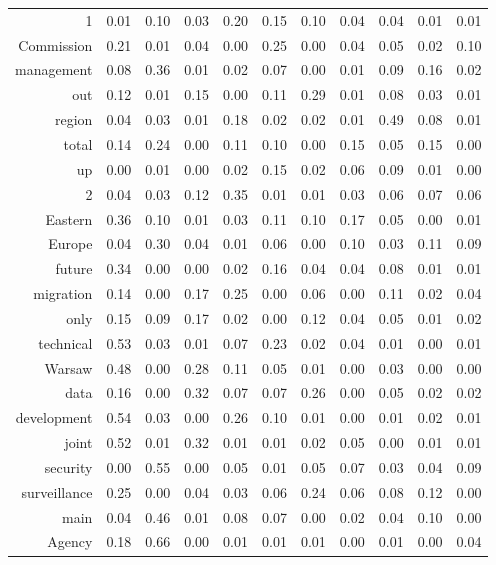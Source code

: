 \begin{longtable}{rrrrrrrrrrr}
  1 & 0.01 & 0.10 & 0.03 & 0.20 & 0.15 & 0.10 & 0.04 & 0.04 & 0.01 & 0.01 \\ 
  Commission & 0.21 & 0.01 & 0.04 & 0.00 & 0.25 & 0.00 & 0.04 & 0.05 & 0.02 & 0.10 \\ 
  management & 0.08 & 0.36 & 0.01 & 0.02 & 0.07 & 0.00 & 0.01 & 0.09 & 0.16 & 0.02 \\ 
  out & 0.12 & 0.01 & 0.15 & 0.00 & 0.11 & 0.29 & 0.01 & 0.08 & 0.03 & 0.01 \\ 
  region & 0.04 & 0.03 & 0.01 & 0.18 & 0.02 & 0.02 & 0.01 & 0.49 & 0.08 & 0.01 \\ 
  total & 0.14 & 0.24 & 0.00 & 0.11 & 0.10 & 0.00 & 0.15 & 0.05 & 0.15 & 0.00 \\ 
  up & 0.00 & 0.01 & 0.00 & 0.02 & 0.15 & 0.02 & 0.06 & 0.09 & 0.01 & 0.00 \\ 
  2 & 0.04 & 0.03 & 0.12 & 0.35 & 0.01 & 0.01 & 0.03 & 0.06 & 0.07 & 0.06 \\ 
  Eastern & 0.36 & 0.10 & 0.01 & 0.03 & 0.11 & 0.10 & 0.17 & 0.05 & 0.00 & 0.01 \\ 
  Europe & 0.04 & 0.30 & 0.04 & 0.01 & 0.06 & 0.00 & 0.10 & 0.03 & 0.11 & 0.09 \\ 
  future & 0.34 & 0.00 & 0.00 & 0.02 & 0.16 & 0.04 & 0.04 & 0.08 & 0.01 & 0.01 \\ 
  migration & 0.14 & 0.00 & 0.17 & 0.25 & 0.00 & 0.06 & 0.00 & 0.11 & 0.02 & 0.04 \\ 
  only & 0.15 & 0.09 & 0.17 & 0.02 & 0.00 & 0.12 & 0.04 & 0.05 & 0.01 & 0.02 \\ 
  technical & 0.53 & 0.03 & 0.01 & 0.07 & 0.23 & 0.02 & 0.04 & 0.01 & 0.00 & 0.01 \\ 
  Warsaw & 0.48 & 0.00 & 0.28 & 0.11 & 0.05 & 0.01 & 0.00 & 0.03 & 0.00 & 0.00 \\ 
  data & 0.16 & 0.00 & 0.32 & 0.07 & 0.07 & 0.26 & 0.00 & 0.05 & 0.02 & 0.02 \\ 
  development & 0.54 & 0.03 & 0.00 & 0.26 & 0.10 & 0.01 & 0.00 & 0.01 & 0.02 & 0.01 \\ 
  joint & 0.52 & 0.01 & 0.32 & 0.01 & 0.01 & 0.02 & 0.05 & 0.00 & 0.01 & 0.01 \\ 
  security & 0.00 & 0.55 & 0.00 & 0.05 & 0.01 & 0.05 & 0.07 & 0.03 & 0.04 & 0.09 \\ 
  surveillance & 0.25 & 0.00 & 0.04 & 0.03 & 0.06 & 0.24 & 0.06 & 0.08 & 0.12 & 0.00 \\ 
  main & 0.04 & 0.46 & 0.01 & 0.08 & 0.07 & 0.00 & 0.02 & 0.04 & 0.10 & 0.00 \\ 
  Agency & 0.18 & 0.66 & 0.00 & 0.01 & 0.01 & 0.01 & 0.00 & 0.01 & 0.00 & 0.04 \\ 

\end{longtable}
